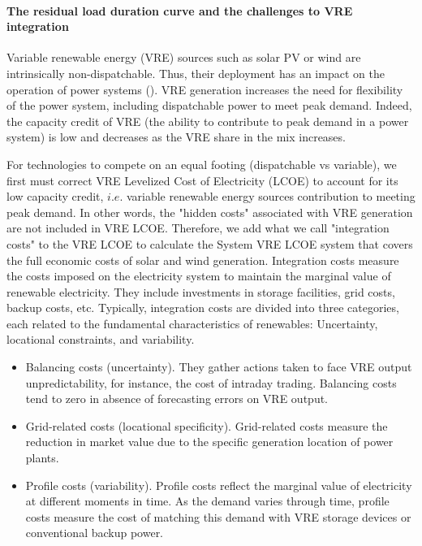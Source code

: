\paragraph{The residual load duration curve and the challenges to VRE integration }

Variable renewable energy (VRE) sources such as solar PV or wind are intrinsically non-dispatchable. Thus, their deployment has an impact on the operation of power systems (\cite{Hirth2015}). VRE generation increases the need for flexibility of the power system, including dispatchable power to meet peak demand. Indeed, the capacity credit of VRE (the ability to contribute to peak demand in a power system) is low and decreases as the VRE share in the mix increases.

For technologies to compete on an equal footing (dispatchable vs variable), we first must correct VRE Levelized Cost of Electricity (LCOE) to account for its low capacity credit, $i.e.$ variable renewable energy sources contribution to meeting peak demand. In other words, the "hidden costs" associated with VRE generation are not included in VRE LCOE. Therefore, we add what we call "integration costs" to the VRE LCOE to calculate the System VRE LCOE system that covers the full economic costs of solar and wind generation. Integration costs measure the costs imposed on the electricity system to maintain the marginal value of renewable electricity. They include investments in storage facilities, grid costs, backup costs, etc. Typically, integration costs are divided into three categories, each related to the fundamental characteristics of renewables: Uncertainty, locational constraints, and variability.
\begin{itemize}
    \item Balancing costs (uncertainty). They gather actions taken to face VRE output unpredictability, for instance, the cost of intraday trading. Balancing costs tend to zero in absence of forecasting errors on VRE output.
    \item Grid-related costs (locational specificity). Grid-related costs measure the reduction in market value due to the specific generation location of power plants.
    \item Profile costs (variability). Profile costs reflect the marginal value of electricity at different moments in time. As the demand varies through time, profile costs measure the cost of matching this demand with VRE storage devices or conventional backup power.
\end{itemize}

